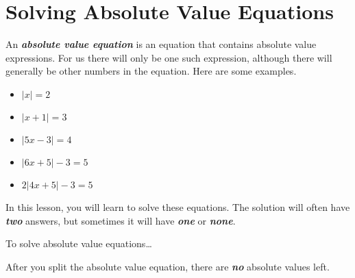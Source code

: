 

\section*{Solving Absolute Value Equations}

An {\bfseries\itshape absolute value equation} is an equation that contains absolute value expressions. 
For us there will only be one such expression, although there will generally be other numbers in the equation.
Here are some examples.
\begin{itemize}[itemsep=0in]
    \item $|x| = 2$
    \item $|x+1| = 3$
    \item $|5x-3| = 4$
    \item $|6x+5| -3 = 5$
    \item $2|4x+5| -3 = 5$
\end{itemize}

In this lesson, you will learn to solve these equations.
The solution will often have {\bfseries\itshape two} answers, 
but sometimes it will have {\bfseries\itshape one} or {\bfseries\itshape none}.

\begin{myConceptSteps}{To solve absolute value equations\dots}
\end{myConceptSteps}

\begin{center}
    \begin{tcolorbox}[width=4in]
        After you split the absolute value equation,
        there are {\bfseries\itshape no} absolute values left.
    \end{tcolorbox}
\end{center}





